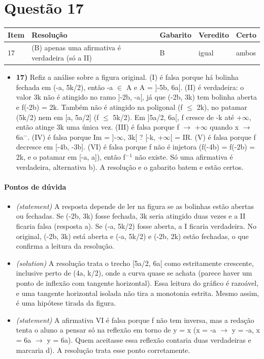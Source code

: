 \documentclass{article}%
\begin{document}
\section*{Questão 17}%
\begin{longtable}{@{}p{} p{} p{} p{} p{}@{}}\toprule Item & Resolução & Gabarito & Veredito & Certo \\ \midrule
17 & (B) apenas uma afirmativa é verdadeira (só a II) & B & igual & ambos \\
\bottomrule\end{longtable}%
\begin{itemize}%
\item%
\textbf{17)} Refiz a análise sobre a figura original. (I) é falsa porque há bolinha fechada em (-a, 5k/2), então -a $\in$ A e A = {]}-5b, 6a{[}. (II) é verdadeira: o valor 3k não é atingido no ramo {]}-2b, -a{[}, já que (-2b, 3k) tem bolinha aberta e f(-2b) = 2k. Também não é atingido na poligonal (f $\leq$ 2k), no patamar (5k/2) nem em {[}a, 5a/2{]} (f $\leq$ 5k/2). Em {]}5a/2, 6a{[}, f cresce de -k até +$\infty$, então atinge 3k uma única vez. (III) é falsa porque f $\to$ +$\infty$ quando x $\to$ 6a$^{-}$. (IV) é falsa porque Im = {]}-$\infty$, 3k{[} ? {[}-k, +$\infty${[} = IR. (V) é falsa porque f decresce em {[}-4b, -3b{]}. (VI) é falsa porque f não é injetora (f(-4b) = f(-2b) = 2k, e o patamar em {[}-a, a{]}), então f$^{-}$$^{1}$ não existe. Só uma afirmativa é verdadeira, alternativa b). A resolução e o gabarito batem e estão certos.%
\end{itemize}%
\paragraph{Pontos de dúvida}%
\begin{itemize}%
\item%
\textit{(statement)} A resposta depende de ler na figura se as bolinhas estão abertas ou fechadas. Se (-2b, 3k) fosse fechada, 3k seria atingido duas vezes e a II ficaria falsa (resposta a). Se (-a, 5k/2) fosse aberta, a I ficaria verdadeira. No original, (-2b, 3k) está aberta e (-a, 5k/2) e (-2b, 2k) estão fechadas, o que confirma a leitura da resolução.%
\item%
\textit{(solution)} A resolução trata o trecho {[}5a/2, 6a{[} como estritamente crescente, inclusive perto de (4a, k/2), onde a curva quase se achata (parece haver um ponto de inflexão com tangente horizontal). Essa leitura do gráfico é razoável, e uma tangente horizontal isolada não tira a monotonia estrita. Mesmo assim, é uma hipótese tirada da figura.%
\item%
\textit{(statement)} A afirmativa VI é falsa porque f não tem inversa, mas a redação tenta o aluno a pensar só na reflexão em torno de y = x (x = -a $\to$ y = -a, x = 6a $\to$ y = 6a). Quem aceitasse essa reflexão contaria duas verdadeiras e marcaria d). A resolução trata esse ponto corretamente.%
\end{itemize}%
\end{document}
